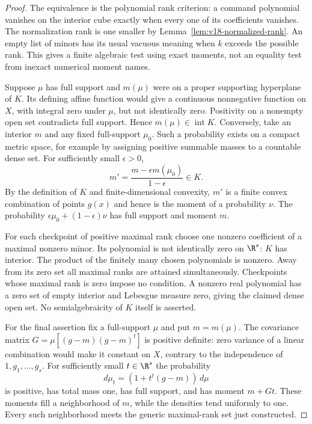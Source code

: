 \begin{proof}
The equivalence is the polynomial rank criterion: a command polynomial
vanishes on the interior cube exactly when every one of its coefficients
vanishes. The normalization rank is one smaller by
Lemma~\ref{lem:v18-normalized-rank}. An empty list of minors has its
usual vacuous meaning when $k$ exceeds the possible rank. This gives a
finite algebraic test using exact moments, not an equality test from
inexact numerical moment names.

Suppose $\mu$ has full support and $m(\mu)$ were on a proper supporting
hyperplane of $K$. Its defining affine function would give a continuous
nonnegative function on $X$, with integral zero under $\mu$, but not
identically zero. Positivity on a nonempty open set contradicts full
support. Hence $m(\mu)\in\operatorname{int}K$. Conversely, take an
interior $m$ and any fixed full-support $\mu_0$. Such a probability
exists on a compact metric space, for example by assigning positive
summable masses to a countable dense set. For sufficiently small
$\epsilon>0$,
\[
 m'=\frac{m-\epsilon m(\mu_0)}{1-\epsilon}\in K.
\]
By the definition of $K$ and finite-dimensional convexity, $m'$ is a
finite convex combination of points $g(x)$ and hence is the moment of
a probability $\nu$. The probability
$\epsilon\mu_0+(1-\epsilon)\nu$ has full support and moment $m$.

For each checkpoint of positive maximal rank choose one nonzero
coefficient of a maximal nonzero minor. Its polynomial is not
identically zero on $\R^s$: $K$ has interior. The product of the
finitely many chosen polynomials is nonzero. Away from its zero set
all maximal ranks are attained simultaneously. Checkpoints whose
maximal rank is zero impose no condition. A nonzero real polynomial
has a zero set of empty interior and Lebesgue measure zero, giving the
claimed dense open set. No semialgebraicity of $K$ itself is asserted.

For the final assertion fix a full-support $\mu$ and put $m=m(\mu)$.
The covariance matrix $G=\mu[(g-m)(g-m)^t]$ is positive definite:
zero variance of a linear combination would make it constant on $X$,
contrary to the independence of $1,g_1,\ldots,g_s$. For sufficiently
small $t\in\R^s$ the probability
\[
 d\mu_t=(1+t^t(g-m))\,d\mu
\]
is positive, has total mass one, has full support, and has moment
$m+Gt$. These moments fill a neighborhood of $m$, while the densities
tend uniformly to one. Every such neighborhood meets the generic
maximal-rank set just constructed.
\end{proof}

